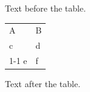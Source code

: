 \documentclass[12pt]{article}
\begin{document}
Text before the table.

\begin{tabular}{|l|l|}\hline A & B\\\arrayrulecolor{blue}\hline c & d\\\cline{1-1} e & f\\\hline\end{tabular}

Text after the table.
\end{document}
